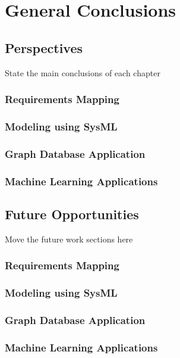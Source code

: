 
\chapter{General Conclusions}
\section{Perspectives}
State the main conclusions of each chapter

\subsection*{Requirements Mapping}
\subsection*{Modeling using SysML}
\subsection*{Graph Database Application}
\subsection*{Machine Learning Applications}

\section{Future Opportunities}
Move the future work sections here
\subsection*{Requirements Mapping}
\subsection*{Modeling using SysML}
\subsection*{Graph Database Application}
\subsection*{Machine Learning Applications}

